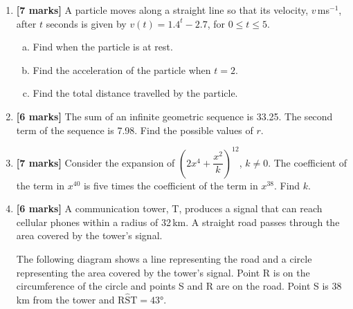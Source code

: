 \documentclass[12pt, twoside]{article}
\begin{document}
\begin{enumerate}
\vspace{1cm}

\item \textbf{[7 marks]} A particle moves along a straight line so that its velocity, $v$\,ms$^{-1}$, after $t$ seconds is given by $v(t) = 1.4^t - 2.7$, for $0 \leq t \leq 5$.

\begin{enumerate}[(a)]
    \item Find when the particle is at rest.
    \item Find the acceleration of the particle when $t = 2$.
    \item Find the total distance travelled by the particle.
\end{enumerate}

\vspace{1cm}

\item \textbf{[6 marks]} The sum of an infinite geometric sequence is 33.25. The second term of the sequence is 7.98. Find the possible values of $r$.

\vspace{1cm}

\item \textbf{[7 marks]} Consider the expansion of $\left(2x^4 + \dfrac{x^2}{k}\right)^{12}$, $k \neq 0$. The coefficient of the term in $x^{40}$ is five times the coefficient of the term in $x^{38}$. Find $k$.

\vspace{1cm}

\item \textbf{[6 marks]} A communication tower, T, produces a signal that can reach cellular phones within a radius of 32\,km. A straight road passes through the area covered by the tower's signal.

The following diagram shows a line representing the road and a circle representing the area covered by the tower's signal. Point R is on the circumference of the circle and points S and R are on the road. Point S is 38\,km from the tower and $\mathrm{R\hat{S}T} = 43°$.

\begin{center}
\end{center}
\end{enumerate}
\end{document}

